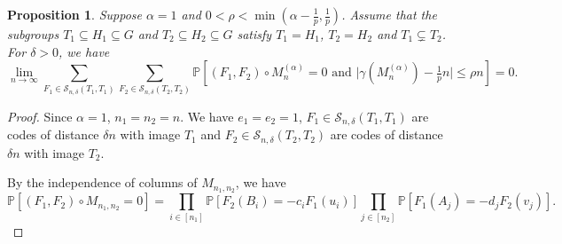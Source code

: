\documentclass[12pt]{amsart}
\newtheorem{proposition}[theorem]{Proposition}
\theoremstyle{definition}
\newcommand{\PPP}{\mathbb{P}}
\newcommand{\SSS}[3]{\mathcal{S}_{#1}(#2,#3)}
\newcommand{\Mnot}{M_{n_1,n_2}}
\newcommand{\Mna}{M_{n}^{(\alpha)}}
\newcommand{\abs}[1]{\vert#1\vert}
\begin{document}
\begin{proposition}\label{Prop: ind diag error term alpha 1}
Suppose $\alpha=1$ and $0<\rho< \min(\alpha-\frac{1}{p},\frac{1}{p})$.
Assume that the subgroups $T_1\subseteq H_1\subseteq G$ and $T_2\subseteq H_2\subseteq G$ satisfy $T_1=H_1$, $T_2=H_2$ and $T_1\subsetneq T_2$.
For $\delta>0$, we have
\[
\lim_{n\to\infty}
\sum_{F_1\in \SSS{n,\delta}{T_1}{T_1}}
\sum_{F_2\in \SSS{n,\delta}{T_2}{T_2}}
\PPP[(F_1,F_2)\circ \Mna=0 \text{ and } \abs{\gamma(\Mna)-\tfrac{1}{p}n} \leq \rho n]
=0.
\]
\end{proposition}
\begin{proof}
Since $\alpha=1$, $n_1=n_2=n$.
We have $e_1=e_2=1$, $F_1\in \SSS{n,\delta}{T_1}{T_1}$ are codes of distance $\delta n$ with image $T_1$ and $F_2\in \SSS{n,\delta}{T_2}{T_2}$ are codes of distance $\delta n$ with image $T_2$.

By the independence of columns of $\Mnot$, we have
\[
\PPP[(F_1,F_2)\circ \Mnot=0]
=\prod_{i\in [n_1]} \PPP[F_2(B_i)=-c_iF_1(u_i)]
\prod_{j\in [n_2]} \PPP[F_1(A_j)=-d_jF_2(v_j)].
\]


\end{proof}
\end{document}
